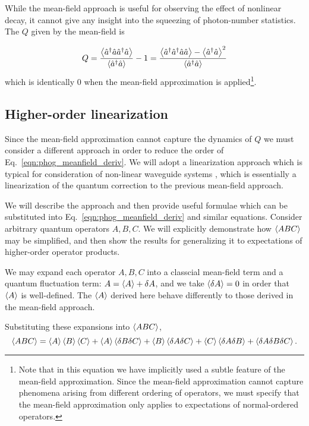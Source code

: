 While the mean-field approach is useful for observing the effect of nonlinear decay, it cannot give any insight into the squeezing of photon-number statistics. The $Q$ given by the mean-field is 

\begin{equation}
Q = \frac{\ev{\hat{a}^\dagger \hat{a} \hat{a}^\dagger \hat{a}}}{\ev{\hat{a}^\dagger \hat{a}}} - 1 = \frac{\ev{\hat{a}^\dagger \hat{a}^\dagger \hat{a} \hat{a}} - \ev{\hat{a}^\dagger \hat{a}}^2}{\ev{\hat{a}^\dagger \hat{a}}}
\end{equation}
which is identically $0$ when the mean-field approximation is applied\footnote{Note that in this equation we have implicitly used a subtle feature of the mean-field approximation. Since the mean-field approximation cannot capture phenomena arising from different ordering of operators, we must specify that the mean-field approximation only applies to expectations of normal-ordered operators.}.

\subsection{Higher-order linearization}\label{sec:linearization}
Since the mean-field approximation cannot capture the dynamics of $Q$ we must consider a different approach in order to reduce the order of Eq.~\ref{eqn:phog_meanfield_deriv}. We will adopt a linearization approach which is typical for consideration of non-linear waveguide systems , which is essentially a linearization of the quantum correction to the previous mean-field approach. 

We will describe the approach and then provide useful formulae which can be substituted into Eq.~\ref{eqn:phog_meanfield_deriv} and similar equations. Consider arbitrary quantum operators $A, B, C$. We will explicitly demonstrate how $\ev{ABC}$ may be simplified, and then show the results for generalizing it to expectations of higher-order operator products. 

We may expand each operator $A, B, C$ into a classcial mean-field term and a quantum fluctuation term: $A = \ev{A} + \delta A$, and we take $\ev{\delta A} = 0$ in order that $\ev{A}$ is well-defined. The $\ev{A}$ derived here behave differently to those derived in the mean-field approach.

Substituting these expansions into $\ev{A B C}$,
\begin{equation}\label{eqn:phog_linearization_deriv}
\ev{A B C} = \ev{A}\ev{B}\ev{C} + \ev{A}\ev{\delta B \delta C} + \ev{B} \ev{\delta A \delta C} + \ev{C} \ev{\delta A \delta B} + \ev{\delta A \delta B \delta C}.
\end{equation}

